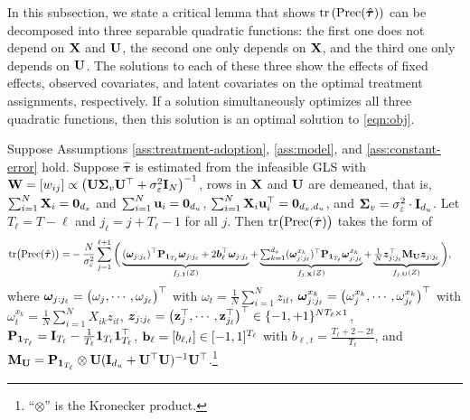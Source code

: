 {    In this subsection, we state a critical lemma that shows $\mathrm{tr}\left(\mathrm{Prec}(\hat{\bm{\tau}})\right) $ can be decomposed into three separable quadratic functions: the first one does not depend on $\mathbf{X}$ and $\mathbf{U}$, the second one only depends on $\mathbf{X}$, and the third one only depends on $\mathbf{U}$. The solutions to each of these three show the effects of fixed effects, observed covariates, and latent covariates on the optimal treatment assignments, respectively. If a solution simultaneously optimizes all three quadratic functions, then this solution is an optimal solution to \eqref{eqn:obj}.
    
    \begin{lemma}\label{lemma:simplify-obj}
		Suppose Assumptions \ref{ass:treatment-adoption}, \ref{ass:model}, and \ref{ass:constant-error} hold. Suppose $\hat{\bm{\tau}} $ is estimated from the infeasible GLS with $\mathbf{W}= [w_{ij}] \propto \big(\mathbf{U} \mathbf{\Sigma}_v \mathbf{U}^\top + \sigma_\varepsilon^2 \mathbf{I}_N \big)^{-1} $,  rows in $\mathbf{X}$ and $\mathbf{U}$ are demeaned, that is, $\sum_{i = 1}^N \mathbf{X}_i = \bm{0}_{d_x}$ and $\sum_{i = 1}^N \mathbf{u}_i = \bm{0}_{d_u}$,  $\sum_{i = 1}^N \mathbf{X}_i \mathbf{u}_i^\top = \mathbf{0}_{d_x,d_u}$, and $\mathbf{\Sigma}_v = \sigma_\varepsilon^2 \cdot \mathbf{I}_{d_u}$.
		Let $T_\ell = T - \ell$ and $j_\ell = j + T_\ell - 1$ for all $j$. Then $\mathrm{tr} \big(\mathrm{Prec}(\hat{\bm{\tau}})  \big) $  takes the form of
		\begin{equation}\label{eqn:carryover-quadratic}
		\begin{aligned}
		\mathrm{tr} \big(\mathrm{Prec}(\hat{\bm{\tau}})  \big)  =& - \frac{N}{\sigma_{\varepsilon}^2} \sum_{j = 1}^{\ell+1} 
		\bigg(  \underbrace{ (\bm{\omega}_{j:j_\ell})^\top \mathbf{P}_{\bm{1}_{T_\ell}}  \bm{\omega}_{j:j_\ell}  + 2 \bm{b}_{\ell}^\top \bm{\omega}_{j:j_\ell} }_{f_{j,\bm{1}}(Z)} +  \underbrace{\textstyle  \sum_{k=1}^{d_x}  (\bm{\omega}_{j:j_\ell}^{x_k})^\top \mathbf{P}_{\bm{1}_{T_\ell}}  \bm{\omega}_{j:j_\ell}^{x_k}  }_{f_{j,\mathbf{X}}(Z)} + \underbrace{\textstyle \frac{1}{N} \bm{z}_{j:j_\ell}^\top \mathbf{M}_{\mathbf{U}} \bm{z}_{j:j_\ell} }_{f_{j,\mathbf{U}}(Z)} \bigg),
		\end{aligned}
		\end{equation}
		where $\bm{\omega}_{j:j_\ell} = \big({\omega}_j, \cdots, {\omega}_{j_\ell}\big)^\top$ with ${\omega}_t = \frac{1}{N} \sum_{i=1}^N z_{it} $, $\bm{\omega}_{j:j_\ell}^{x_k} = \big(	{\omega}^{x_k}_j, \cdots, {\omega}^{x_k}_{j_\ell} \big)^\top$ with ${\omega}^{x_k}_t =\frac{1}{N} \sum_{i=1}^N X_{ik} z_{it}$, 
		$\bm{z}_{j:j_\ell} = \big(\mathbf{z}_{j}^\top, \cdots, \mathbf{z}_{j_\ell}^\top \big)^\top \in \{-1,+1\}^{N T_\ell\times 1}$,  $\mathbf{P}_{\bm{1}_{T_\ell}} = \mathbf{I}_{T_\ell} - \frac{1}{T_\ell} \bm{1}_{T_\ell} \bm{1}_{T_\ell}^\top$, $\mathbf{b}_\ell = [b_{\ell,t}] \in [-1,1]^{T_\ell}$ with $b_{\ell,t} = \frac{T_\ell+2-2t}{T_\ell} $, and $\mathbf{M}_{\mathbf{U}} = \mathbf{P}_{\bm{1}_{T_\ell}} \otimes \mathbf{U} (\mathbf{I}_{d_u} + \mathbf{U}^\top \mathbf{U})^{-1} \mathbf{U}^\top$.\footnote{``$\otimes$'' is the Kronecker product.}
	\end{lemma}

}
